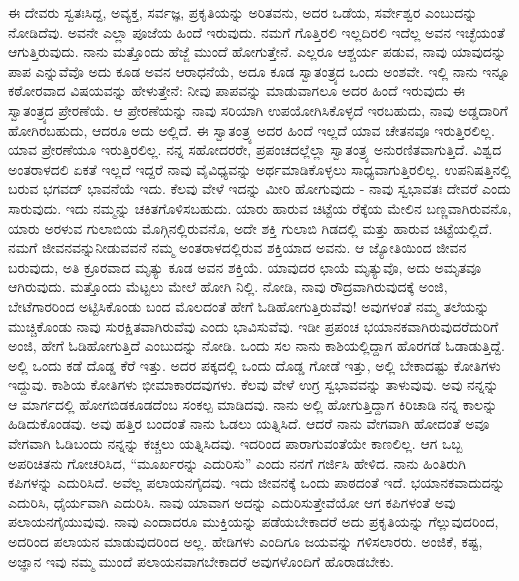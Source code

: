 ಈ ದೇವರು ಸ್ವತಃಸಿದ್ದ, ಅವ್ಯಕ್ತ, ಸರ್ವಜ್ಞ, ಪ್ರಕೃತಿಯನ್ನು ಅರಿತವನು, ಅದರ ಒಡೆಯ, ಸರ್ವೇಶ್ವರ ಎಂಬುದನ್ನು ನೋಡಿದೆವು. ಅವನೇ ಎಲ್ಲಾ ಪೂಜೆಯ ಹಿಂದೆ ಇರುವುದು. ನಮಗೆ ಗೊತ್ತಿರಲಿ ಇಲ್ಲದಿರಲಿ ಇದೆಲ್ಲ ಅವನ ಇಚ್ಛೆಯಂತೆ ಆಗುತ್ತಿರುವುದು. ನಾನು ಮತ್ತೊಂದು ಹೆಜ್ಜೆ ಮುಂದೆ ಹೋಗುತ್ತೇನೆ. ಎಲ್ಲರೂ ಆಶ್ಚರ್ಯ ಪಡುವ, ನಾವು ಯಾವುದನ್ನು ಪಾಪ ಎನ್ನುವೆವೊ ಅದು ಕೂಡ ಅವನ ಆರಾಧನೆಯೆ, ಅದೂ ಕೂಡ ಸ್ವಾತಂತ್ರ್ಯದ ಒಂದು ಅಂಶವೇ. ಇಲ್ಲಿ ನಾನು ಇನ್ನೂ ಕಠೋರವಾದ ವಿಷಯವನ್ನು ಹೇಳುತ್ತೇನೆ: ನೀವು ಪಾಪವನ್ನು ಮಾಡುವಾಗಲೂ ಅದರ ಹಿಂದೆ ಇರುವುದು ಈ ಸ್ವಾತಂತ್ರ್ಯದ ಪ್ರೇರಣೆಯೆ. ಆ ಪ್ರೇರಣೆಯನ್ನು ನಾವು ಸರಿಯಾಗಿ ಉಪಯೋಗಿಸಿಕೊಳ್ಳದೆ ಇರಬಹುದು, ನಾವು ಅಡ್ಡದಾರಿಗೆ ಹೋಗಿರಬಹುದು, ಆದರೂ ಅದು ಅಲ್ಲಿದೆ. ಈ ಸ್ವಾತಂತ್ರ್ಯ ಅದರ ಹಿಂದೆ ಇಲ್ಲದೆ ಯಾವ ಚೇತನವೂ ಇರುತ್ತಿರಲಿಲ್ಲ. ಯಾವ ಪ್ರೇರಣೆಯೂ ಇರುತ್ತಿರಲಿಲ್ಲ. ನನ್ನ ಸಹೋದರರೇ, ಪ್ರಪಂಚದಲ್ಲೆಲ್ಲಾ ಸ್ವಾತಂತ್ರ್ಯ ಅನುರಣಿತವಾಗುತ್ತಿದೆ. ವಿಶ್ವದ ಅಂತರಾಳದಲಿ ಏಕತೆ ಇಲ್ಲದೆ ಇದ್ದರೆ ನಾವು ವೈವಿಧ್ಯವನ್ನು ಅರ್ಥಮಾಡಿಕೊಳ್ಳಲು ಸಾಧ್ಯವಾಗುತ್ತಿರಲಿಲ್ಲ. ಉಪನಿಷತ್ತಿನಲ್ಲಿ ಬರುವ ಭಗವದ್ ಭಾವನೆಯೆ ಇದು. ಕೆಲವು ವೇಳೆ ಇದನ್ನು ಮೀರಿ ಹೋಗುವುದು - ನಾವು ಸ್ವಭಾವತಃ ದೇವರೆ ಎಂದು ಸಾರುವುದು. ಇದು ನಮ್ಮನ್ನು ಚಕಿತಗೊಳಿಸಬಹುದು. ಯಾರು ಹಾರುವ ಚಿಟ್ಟೆಯ ರೆಕ್ಕೆಯ ಮೇಲಿನ ಬಣ್ಣವಾಗಿರುವನೊ, ಯಾರು ಅರಳುವ ಗುಲಾಬಿಯ ಮೊಗ್ಗಿನಲ್ಲಿರುವನೊ, ಅದೇ ಶಕ್ತಿ ಗುಲಾಬಿ ಗಿಡದಲ್ಲಿ ಮತ್ತು ಹಾರುವ ಚಿಟ್ಟೆಯಲ್ಲಿದೆ. ನಮಗೆ ಜೀವನವನ್ನುನೀಡುವವನೆ ನಮ್ಮ ಅಂತರಾಳದಲ್ಲಿರುವ ಶಕ್ತಿಯಾದ ಅವನು. ಆ ಜ್ಯೋತಿಯಿಂದ ಜೀವನ ಬರುವುದು, ಅತಿ ಕ್ರೂರವಾದ ಮೃತ್ಯು ಕೂಡ ಅವನ ಶಕ್ತಿಯೆ. ಯಾವುದರ ಛಾಯೆ ಮೃತ್ಯುವೊ, ಅದು ಅಮೃತವೂ ಆಗಿರುವುದು. ಮತ್ತೊಂದು ಮೆಟ್ಟಲು ಮೇಲೆ ಹೋಗಿ ನಿಲ್ಲಿ. ನೋಡಿ, ನಾವು ರೌದ್ರವಾಗಿರುವುದಕ್ಕೆ ಅಂಜಿ, ಬೇಟೆಗಾರರಿಂದ ಅಟ್ಟಿಸಿಕೊಂಡು ಬಂದ ಮೊಲದಂತೆ ಹೇಗೆ ಓಡಿಹೋಗುತ್ತಿರುವೆವು! ಅವುಗಳಂತೆ ನಮ್ಮ ತಲೆಯನ್ನು ಮುಚ್ಚಿಕೊಂಡು ನಾವು ಸುರಕ್ಷಿತವಾಗಿರುವೆವು ಎಂದು ಭಾವಿಸುವೆವು. ಇಡೀ ಪ್ರಪಂಚ ಭಯಾನಕವಾಗಿರುವುದರೆದುರಿಗೆ ಅಂಜಿ, ಹೇಗೆ ಓಡಿಹೋಗುತ್ತಿದೆ ಎಂಬುದನ್ನು ನೋಡಿ. ಒಂದು ಸಲ ನಾನು ಕಾಶಿಯಲ್ಲಿದ್ದಾಗ ಹೊರಗಡೆ ಓಡಾಡುತ್ತಿದ್ದೆ. ಅಲ್ಲಿ ಒಂದು ಕಡೆ ದೊಡ್ಡ ಕೆರೆ ಇತ್ತು. ಅದರ ಪಕ್ಕದಲ್ಲಿ ಒಂದು ದೊಡ್ಡ ಗೋಡೆ ಇತ್ತು, ಅಲ್ಲಿ ಬೇಕಾದಷ್ಟು ಕೋತಿಗಳು ಇದ್ದುವು. ಕಾಶಿಯ ಕೋತಿಗಳು ಭೀಮಾಕಾರದವುಗಳು. ಕೆಲವು ವೇಳೆ ಉಗ್ರ ಸ್ವಭಾವವನ್ನು ತಾಳುವುವು. ಅವು ನನ್ನನ್ನು ಆ ಮಾರ್ಗದಲ್ಲಿ ಹೋಗಬಿಡಕೂಡದೆಂಬ ಸಂಕಲ್ಪ ಮಾಡಿದವು. ನಾನು ಅಲ್ಲಿ ಹೋಗುತ್ತಿದ್ದಾಗ ಕಿರಿಚಾಡಿ ನನ್ನ ಕಾಲನ್ನು ಹಿಡಿದುಕೊಂಡವು. ಅವು ಹತ್ತಿರ ಬಂದಂತೆ ನಾನು ಓಡಲು ಯತ್ನಿಸಿದೆ. ಆದರೆ ನಾನು ವೇಗವಾಗಿ ಹೋದಂತೆ ಅವೂ ವೇಗವಾಗಿ ಓಡಿಬಂದು ನನ್ನನ್ನು ಕಚ್ಚಲು ಯತ್ನಿಸಿದವು. ಇದರಿಂದ ಪಾರಾಗುವಂತೆಯೇ ಕಾಣಲಿಲ್ಲ. ಆಗ ಒಬ್ಬ ಅಪರಿಚಿತನು ಗೋಚರಿಸಿದ, “ಮೂರ್ಖರನ್ನು ಎದುರಿಸು'' ಎಂದು ನನಗೆ ಗರ್ಜಿಸಿ ಹೇಳಿದ. ನಾನು ಹಿಂತಿರುಗಿ ಕಪಿಗಳನ್ನು ಎದುರಿಸಿದೆ. ಅವೆಲ್ಲ ಪಲಾಯನಗೈದವು. ಇದು ಜೀವನಕ್ಕೆ ಒಂದು ಪಾಠದಂತೆ ಇದೆ. ಭಯಾನಕವಾದುದನ್ನು ಎದುರಿಸಿ, ಧೈರ್ಯವಾಗಿ ಎದುರಿಸಿ. ನಾವು ಯಾವಾಗ ಅದನ್ನು ಎದುರಿಸುತ್ತೇವೆಯೋ ಆಗ ಕಪಿಗಳಂತೆ ಅವು ಪಲಾಯನಗೈಯುವುವು. ನಾವು ಎಂದಾದರೂ ಮುಕ್ತಿಯನ್ನು ಪಡೆಯಬೇಕಾದರೆ ಅದು ಪ್ರಕೃತಿಯನ್ನು ಗೆಲ್ಲುವುದರಿಂದ, ಅದರಿಂದ ಪಲಾಯನ ಮಾಡುವುದರಿಂದ ಅಲ್ಲ. ಹೇಡಿಗಳು ಎಂದಿಗೂ ಜಯವನ್ನು ಗಳಿಸಲಾರರು. ಅಂಜಿಕೆ, ಕಷ್ಟ, ಅಜ್ಞಾನ ಇವು ನಮ್ಮ ಮುಂದೆ ಪಲಾಯನವಾಗಬೇಕಾದರೆ ಅವುಗಳೊಂದಿಗೆ ಹೊರಾಡಬೇಕು.

